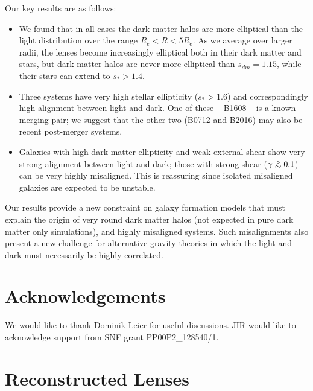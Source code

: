\documentclass[useAMS,usenatbib]{mn2e}
\def\gtsima{$\; \buildrel > \over \sim \;$}
\def\simgt{\lower.5ex\hbox{\gtsima}}
\begin{document}
Our key results are as follows: 

\begin{itemize}
\item We found that in all cases the dark matter halos are more elliptical than the light distribution over the range $R_e < R < 5R_e$. As we average over larger radii, the lenses become increasingly elliptical both in their dark matter and stars, but dark matter halos are never more elliptical than $s_{dm} = 1.15$, while their stars can extend to $s_* > 1.4$. 

\item Three systems have very high stellar ellipticity ($s_* > 1.6$) and correspondingly high alignment between light and dark. One of these -- B1608 -- is a known merging pair; we suggest that the other two (B0712 and B2016) may also be recent post-merger systems. 

\item Galaxies with high dark matter ellipticity and weak external shear show very strong alignment between light and dark; those with strong shear ($\gamma \simgt 0.1$) can be very highly misaligned. This is reassuring since isolated misaligned galaxies are expected to be unstable.
\end{itemize}

Our results provide a new constraint on galaxy formation models that must explain the origin of very round dark matter halos (not expected in pure dark matter only simulations), and highly misaligned systems. Such misalignments also present a new challenge for alternative gravity theories in which the light and dark must necessarily be highly correlated.

\section{Acknowledgements}\label{sec:acknowledgements}
We would like to thank Dominik Leier for useful discussions. JIR would like to acknowledge support from SNF grant PP00P2\_128540/1.




\appendix
\section{Reconstructed Lenses}\label{sec:reconstructions}
\end{document}
